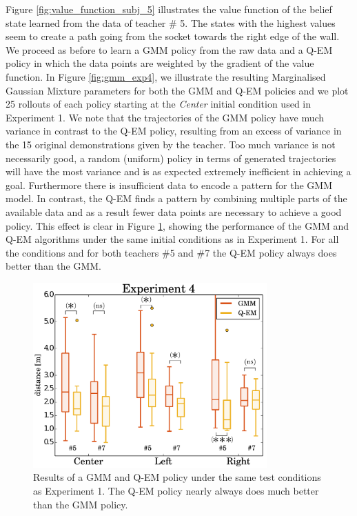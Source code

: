 Figure \ref{fig:value_function_subj_5} illustrates the value function of the belief state learned from the data of teacher \# 5.
The states with the highest values seem to create a path going from the socket towards the right edge of the wall. 
We proceed as before to learn a GMM policy from the raw data and a Q-EM policy in which the data points are weighted by 
the gradient of the value function. In Figure \ref{fig:gmm_exp4}, we illustrate the 
resulting Marginalised Gaussian Mixture parameters for both the GMM and Q-EM policies and we plot 25 rollouts of each policy starting at 
the \textit{Center} initial condition used in Experiment 1. We note that the trajectories of the GMM 
policy have much variance in contrast to the Q-EM policy, resulting from an excess of variance in the 15 original demonstrations
given by the teacher. Too much variance is not necessarily good, a random (uniform) policy in terms of generated trajectories
will have the most variance and is as expected extremely inefficient in achieving a goal. Furthermore there is insufficient data to encode a pattern for the GMM model. In contrast, the Q-EM finds a 
pattern by combining multiple parts of the available data and as a result fewer data points are necessary to achieve a good policy. 
This effect is clear in Figure \ref{fig:experiment4_stats}, showing the performance of the GMM and Q-EM algorithms 
under the same initial conditions as in Experiment 1. For all the conditions and for both teachers \#5 and \#7 the Q-EM policy 
always does better than the GMM.

\begin{figure}
 \centering
 \includegraphics[width=0.8\textwidth]{./ch4-PiH/Figures/Fig/experiment4.pdf}
 \caption{Results of a GMM and Q-EM policy under the same test conditions as Experiment 1. The Q-EM policy nearly always does much better than the GMM policy.}
 \label{fig:experiment4_stats}
\end{figure}

